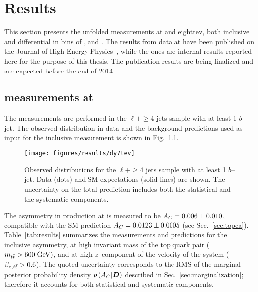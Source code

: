 \chapter{Results}
\label{sec:results}

This section presents the unfolded \ac{} measurements at \seventev{}
and eighttev{}, both inclusive and differential in bins of \mtt{},
\pttt{} and \ytt{}. The results from data at \seventev{} have been
published on the Journal of High Energy Physics~\cite{Aad:2013cea},
while the \eighttev{} ones are internal results reported here for the
purpose of this thesis. The publication results are being finalized
and are expected before the end of 2014. 

\section{\ac{} measurements at \seventev{}}
\label{sec:res7tev}

The measurements are performed in the $\ell{}+\ge4$ jets sample with at least 1
$b$--jet. The observed \dy{} distribution in data and the background
predictions used as input for the inclusive measurement is shown in
Fig.~\ref{fig:dy7tev}.

\begin{figure}[!htb]\centering
  \texttt{[image: figures/results/dy7tev]} 
  \caption{Observed \dy{} distributions for the $\ell{}+\ge4$ jets
    sample with at least 1 $b$--jet. Data (dots) and SM expectations
    (solid lines) are shown. The uncertainty on the total prediction
    includes both the statistical and the systematic components.}
  \label{fig:dy7tev}
\end{figure}

The asymmetry \ac{} in \ttbar{} production at \seventev{} is measured to be
$A_C{}= 0.006\pm0.010$, compatible with the SM prediction
$A_C{}=0.0123\pm0.0005$ (see Sec.~\ref{sec:topca}).
Table~\ref{tab:results} summarizes the
measurements and predictions for the inclusive asymmetry, at high
invariant mass of the top quark pair ($m_{t\bar{t}}{} >600 \; \mathrm{GeV}{})$, and at
high $z$--component of the velocity of the \ttbar{} system ($\beta_{z,t\bar{t}}{}>0.6$).
The quoted uncertainty corresponds to the RMS of the marginal posterior
probability density $p\left(A_C{}|\boldsymbol{D}{}\right)$ described in
Sec.~\ref{sec:marginalization}; therefore it accounts for both
statistical and systematic components.

